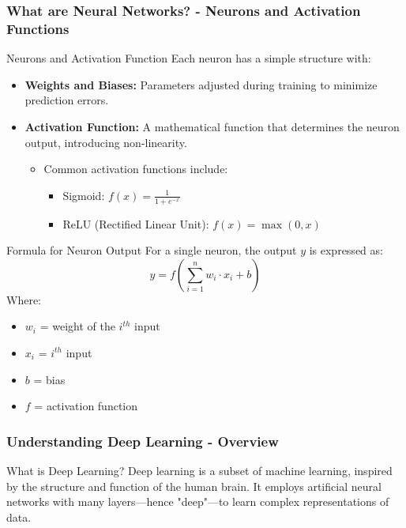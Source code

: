 \documentclass[aspectratio=169]{beamer}
\begin{document}
\begin{frame}[fragile]
    \frametitle{What are Neural Networks? - Neurons and Activation Functions}
    \begin{block}{Neurons and Activation Function}
        Each neuron has a simple structure with:
        \begin{itemize}
            \item \textbf{Weights and Biases:} Parameters adjusted during training to minimize prediction errors.
            \item \textbf{Activation Function:} A mathematical function that determines the neuron output, introducing non-linearity.
                \begin{itemize}
                    \item Common activation functions include:
                        \begin{itemize}
                            \item Sigmoid: $f(x) = \frac{1}{1 + e^{-x}}$
                            \item ReLU (Rectified Linear Unit): $f(x) = \max(0, x)$
                        \end{itemize}
                \end{itemize}
        \end{itemize}
        
        \begin{block}{Formula for Neuron Output}
            For a single neuron, the output \( y \) is expressed as:
            \[
            y = f\left(\sum_{i=1}^{n} w_i \cdot x_i + b\right)
            \]
            Where:
            \begin{itemize}
                \item \( w_i \) = weight of the \( i^{th} \) input
                \item \( x_i \) = \( i^{th} \) input
                \item \( b \) = bias
                \item \( f \) = activation function
            \end{itemize}
        \end{block}
    \end{block}
\end{frame}

\begin{frame}[fragile]
  \frametitle{Understanding Deep Learning - Overview}
  \begin{block}{What is Deep Learning?}
    Deep learning is a subset of machine learning, inspired by the structure and function of the human brain. It employs artificial neural networks with many layers—hence "deep"—to learn complex representations of data.
  \end{block}
\end{frame}
\end{document}
